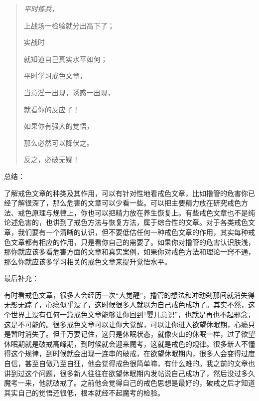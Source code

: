 \documentclass{ctexart}
\begin{document}
\begin{multicols}{2}
    \begin{quotation}\it
        平时练兵，

        上战场一检验就分出高下了；

        实战时

        就知道自己真实水平如何；

        平时学习戒色文章，

        当意淫一出现，诱惑一出现，

        就看你的反应了！

        如果你有强大的觉悟，

        那么必然可以降伏之。

        反之，必破无疑！
    \end{quotation}
\end{multicols}

总结：

了解戒色文章的种类及其作用，可以有针对性地看戒色文章，比如撸管的危害你已经了解很深了，那么危害的文章可以少看一些。可以把主要精力放在研究戒色方法、戒色原理与规律上，你也可以把精力放在养生恢复上。有些戒色文章也不是纯论述危害的，也讲到了戒色方法与恢复方法，属于综合性的文章。对于各类戒色文章，我们要有一个清晰的认识，但不要低估任何一种戒色文章的作用，其实每种戒色文章都有相应的作用，只是看你自己的需要了。如果你对撸管的危害认识肤浅，那你就应该多看危害方面的文章和真实案例，如果你对戒色方法和理论一窍不通，那么你就应该多学习相关的戒色文章来提升觉悟水平。


最后补充：

有时看戒色文章，很多人会经历一次“大觉醒”，撸管的想法和冲动刹那间就消失得无影无踪了，心瘾似乎没了，这时候很多人就以为自己戒色成功了。其实不然，这个世界上没有任何一篇戒色文章能够让你回到“婴儿意识”，也就是再也不起邪念，这是不可能的。很多戒色文章可以让你大觉醒，可以让你进入欲望休眠期，心瘾只是暂时消失了。但千万要记住，这只是休眠状态，就像火山的休眠一样，过了欲望休眠期就是破戒高峰期，到时候就会迎来魔考，这就是戒色的规律。很多新人不懂得这个规律，到时候就会出现一连串的破戒，在欲望休眠期内，很多人会变得过度自信，甚至自傲乃至自狂，他会觉得戒色很简单嘛，有什么难的。我之前的文章也讲到过这个问题，很多新人往往在欲望休眠期内发帖说自己成功了，然后没过多久魔考一来，他就破戒了。之前他会觉得自己的戒色思想是最好的，破戒之后才知道其实自己的觉悟还很低，根本就经不起魔考的检验。
\end{document}
